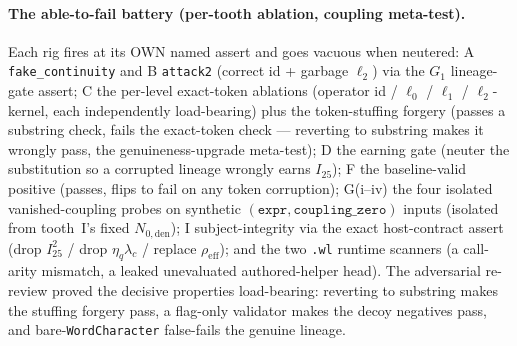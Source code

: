 \paragraph{The able-to-fail battery (per-tooth ablation, coupling meta-test).}
Each rig fires at its OWN named assert and goes vacuous when neutered: A \texttt{fake\_continuity} and B
\texttt{attack2} (correct id + garbage \(\ell_2\)) via the \(G_1\) lineage-gate assert; C the per-level
exact-token ablations (operator id / \(\ell_0\) / \(\ell_1\) / \(\ell_2\)-kernel, each independently
load-bearing) plus the token-stuffing forgery (passes a substring check, fails the exact-token check ---
reverting to substring makes it wrongly pass, the genuineness-upgrade meta-test); D the earning gate
(neuter the substitution so a corrupted lineage wrongly earns \(I_{25}\)); F the baseline-valid positive
(passes, flips to fail on any token corruption); G(i--iv) the four isolated vanished-coupling probes on
synthetic \((\texttt{expr},\texttt{coupling\_zero})\) inputs (isolated from tooth~I's fixed \(N_{0,\mathrm{den}}\));
I subject-integrity via the exact host-contract assert (drop \(I_{25}^2\) / drop \(\eta_q\lambda_c\) / replace
\(\rho_{\mathrm{eff}}\)); and the two \texttt{.wl} runtime scanners (a call-arity mismatch, a leaked
unevaluated authored-helper head). The adversarial re-review proved the decisive properties load-bearing:
reverting to substring makes the stuffing forgery pass, a flag-only validator makes the decoy negatives pass,
and bare-\texttt{WordCharacter} false-fails the genuine lineage.

